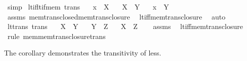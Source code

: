 \begin{isabellebody}
\ simp%
\endisatagproof
{\isafoldproof}%
%
\isadelimproof
\isanewline
%
\endisadelimproof
\isanewline
{}\isamarkupfalse%
\ lt{\isacharunderscore}{\kern0pt}if{\isacharunderscore}{\kern0pt}lt{\isacharunderscore}{\kern0pt}if{\isacharunderscore}{\kern0pt}mem\ {\isacharbrackleft}{\kern0pt}trans{\isacharbrackright}{\kern0pt}{\isacharcolon}{\kern0pt}\isanewline
\ \ \ {\isachardoublequoteopen}x\ {\isasymin}\ X{\isachardoublequoteclose}\isanewline
\ \ \ {\isachardoublequoteopen}X\ {\isacharless}{\kern0pt}\ Y{\isachardoublequoteclose}\isanewline
\ \ \ {\isachardoublequoteopen}x\ {\isacharless}{\kern0pt}\ Y{\isachardoublequoteclose}\isanewline
%
\isadelimproof
\ \ %
\endisadelimproof
%
\isatagproof
{}\isamarkupfalse%
\ assms\ mem{\isacharunderscore}{\kern0pt}trans{\isacharunderscore}{\kern0pt}closed{\isacharunderscore}{\kern0pt}mem{\isacharunderscore}{\kern0pt}trans{\isacharunderscore}{\kern0pt}closure\ \isamarkupfalse%
\ lt{\isacharunderscore}{\kern0pt}iff{\isacharunderscore}{\kern0pt}mem{\isacharunderscore}{\kern0pt}trans{\isacharunderscore}{\kern0pt}closure\ \isamarkupfalse%
\ auto%
\endisatagproof
{\isafoldproof}%
%
\isadelimproof
\isanewline
%
\endisadelimproof
\isanewline
{}\isamarkupfalse%
\ lt{\isacharunderscore}{\kern0pt}trans\ {\isacharbrackleft}{\kern0pt}trans{\isacharbrackright}{\kern0pt}{\isacharcolon}{\kern0pt}\isanewline
\ \ \ {\isachardoublequoteopen}X\ {\isacharless}{\kern0pt}\ Y{\isachardoublequoteclose}\isanewline
\ \ \ {\isachardoublequoteopen}Y\ {\isacharless}{\kern0pt}\ Z{\isachardoublequoteclose}\isanewline
\ \ \ {\isachardoublequoteopen}X\ {\isacharless}{\kern0pt}\ Z{\isachardoublequoteclose}\isanewline
%
\isadelimproof
\ \ %
\endisadelimproof
%
\isatagproof
{}\isamarkupfalse%
\ assms\ \isamarkupfalse%
\ lt{\isacharunderscore}{\kern0pt}iff{\isacharunderscore}{\kern0pt}mem{\isacharunderscore}{\kern0pt}trans{\isacharunderscore}{\kern0pt}closure\ \isamarkupfalse%
\ {\isacharparenleft}{\kern0pt}rule\ mem{\isacharunderscore}{\kern0pt}mem{\isacharunderscore}{\kern0pt}trans{\isacharunderscore}{\kern0pt}closure{\isacharunderscore}{\kern0pt}trans{\isacharparenright}{\kern0pt}%
\endisatagproof
{\isafoldproof}%
%
\isadelimproof
%
\endisadelimproof
%
\begin{isamarkuptext}%
The corollary demonstrates the transitivity of less.%
\end{isamarkuptext}\isamarkuptrue%

\end{isabellebody}
